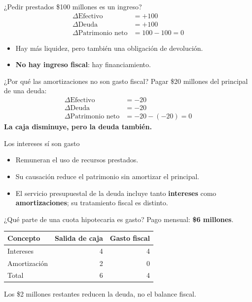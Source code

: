 \begin{frame}{¿Pedir prestados \$100 millones es un ingreso?}
\begin{align*}
  \Delta\text{Efectivo}&=+100\\
  \Delta\text{Deuda}&=+100\\
  \Delta\text{Patrimonio neto}&=100-100=0
\end{align*}
\begin{itemize}
  \item Hay más liquidez, pero también una obligación de devolución.
  \item \textbf{No hay ingreso fiscal}: hay financiamiento.
\end{itemize}
\fuenteFMI
\end{frame}

\begin{frame}{¿Por qué las amortizaciones no son gasto fiscal?}
Pagar \$20 millones del principal de una deuda:
\begin{align*}
  \Delta\text{Efectivo}&=-20\\
  \Delta\text{Deuda}&=-20\\
  \Delta\text{Patrimonio neto}&=-20-(-20)=0
\end{align*}
\textbf{La caja disminuye, pero la deuda también.}
\fuenteFMI
\end{frame}

\begin{frame}{Los intereses sí son gasto}
\begin{itemize}
  \item Remuneran el uso de recursos prestados.
  \item Su causación reduce el patrimonio sin amortizar el principal.
  \item El servicio presupuestal de la deuda incluye tanto \textbf{intereses} como \textbf{amortizaciones}; su tratamiento fiscal es distinto.
\end{itemize}
\fuenteFMI
{}
\end{frame}

\begin{frame}{¿Qué parte de una cuota hipotecaria es gasto?}
Pago mensual: \textbf{\$6 millones}.
\vspace{0.8em}
\begin{center}
\begin{tabular}{lrr}
\toprule
Concepto & Salida de caja & Gasto fiscal\\
\midrule
Intereses & 4 & 4\\
Amortización & 2 & 0\\
\midrule
Total & 6 & 4\\
\bottomrule
\end{tabular}
\end{center}
\vspace{0.6em}
Los \$2 millones restantes reducen la deuda, no el balance fiscal.
\fuenteFMI
\end{frame}

